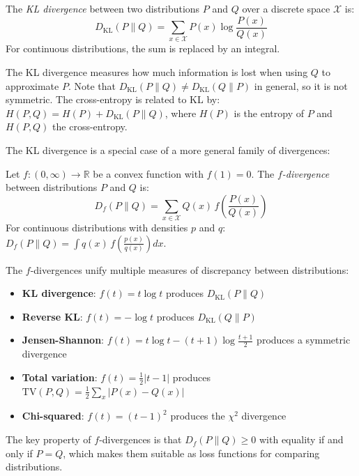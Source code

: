 \begin{definition}\label{def:kl_divergence}
	The \textit{KL divergence} between two distributions \(P\) and \(Q\) over a discrete space \(\mathcal{X}\) is:
	\[
		D_{\text{KL}}(P \| Q) = \sum_{x \in \mathcal{X}} P(x) \log \frac{P(x)}{Q(x)}
	\]
	For continuous distributions, the sum is replaced by an integral.
\end{definition}

The \gls{KL} divergence measures how much information is lost when using \(Q\) to approximate \(P\). Note that \(D_{\text{KL}}(P \| Q) \neq D_{\text{KL}}(Q \| P)\) in general, so it is not symmetric. The cross-entropy is related to \gls{KL} by: \(H(P, Q) = H(P) + D_{\text{KL}}(P \| Q)\), where \(H(P)\) is the entropy of \(P\) and \(H(P, Q)\) the cross-entropy.

The \gls{KL} divergence is a special case of a more general family of divergences:

\begin{definition}[\(f\)-divergence]\label{def:f_divergence}
	Let \(f: (0, \infty) \to \mathbb{R}\) be a convex function with \(f(1) = 0\). The \textit{\(f\)-divergence} between distributions \(P\) and \(Q\) is:
	\[
		D_f(P \| Q) = \sum_{x \in \mathcal{X}} Q(x) \, f\left(\frac{P(x)}{Q(x)}\right)
	\]
	For continuous distributions with densities \(p\) and \(q\): \(D_f(P \| Q) = \int q(x) \, f\left(\frac{p(x)}{q(x)}\right) dx\).
\end{definition}

The \(f\)-divergences unify multiple measures of discrepancy between distributions:
\begin{itemize}
	\item \textbf{KL divergence}: \(f(t) = t \log t\) produces \(D_{\text{KL}}(P \| Q)\)
	\item \textbf{Reverse KL}: \(f(t) = -\log t\) produces \(D_{\text{KL}}(Q \| P)\)
	\item \textbf{Jensen-Shannon}: \(f(t) = t \log t - (t+1) \log \frac{t+1}{2}\) produces a symmetric divergence
	\item \textbf{Total variation}: \(f(t) = \frac{1}{2}|t - 1|\) produces \(\text{TV}(P, Q) = \frac{1}{2}\sum_x |P(x) - Q(x)|\)
	\item \textbf{Chi-squared}: \(f(t) = (t-1)^2\) produces the \(\chi^2\) divergence
\end{itemize}

The key property of \(f\)-divergences is that \(D_f(P \| Q) \geq 0\) with equality if and only if \(P = Q\), which makes them suitable as loss functions for comparing distributions.

